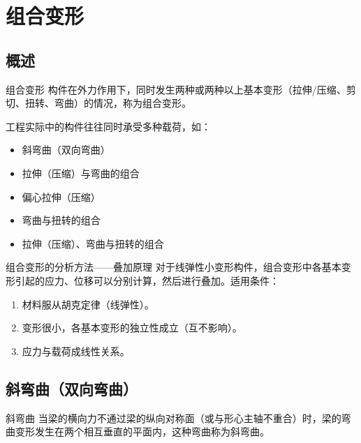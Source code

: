 \chapter{组合变形}


\section{概述}

\begin{mydefinition}{组合变形}
    构件在外力作用下，同时发生两种或两种以上基本变形（拉伸/压缩、剪切、扭转、弯曲）的情况，称为组合变形。
\end{mydefinition}

工程实际中的构件往往同时承受多种载荷，如：
\begin{itemize}
    \item 斜弯曲（双向弯曲）
    \item 拉伸（压缩）与弯曲的组合
    \item 偏心拉伸（压缩）
    \item 弯曲与扭转的组合
    \item 拉伸（压缩）、弯曲与扭转的组合
\end{itemize}

\begin{myhypothesis}{组合变形的分析方法——叠加原理}
    对于线弹性小变形构件，组合变形中各基本变形引起的应力、位移可以分别计算，然后进行叠加。适用条件：
    \begin{enumerate}
        \item 材料服从胡克定律（线弹性）。
        \item 变形很小，各基本变形的独立性成立（互不影响）。
        \item 应力与载荷成线性关系。
    \end{enumerate}
\end{myhypothesis}

\section{斜弯曲（双向弯曲）}

\begin{mydefinition}{斜弯曲}
    当梁的横向力不通过梁的纵向对称面（或与形心主轴不重合）时，梁的弯曲变形发生在两个相互垂直的平面内，这种弯曲称为斜弯曲。
\end{mydefinition}

